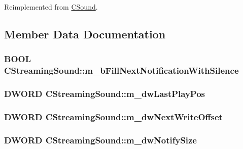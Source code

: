 Reimplemented from \hyperlink{class_c_sound_aaf2b066d599976ba180082b4fa3880e3}{CSound}.

\subsection{Member Data Documentation}
\hypertarget{class_c_streaming_sound_ab229235758b70b36c2e1aeb3d877678c}{
\subsubsection[{m\_\-bFillNextNotificationWithSilence}]{\setlength{\rightskip}{0pt plus 5cm}BOOL {\bf CStreamingSound::m\_\-bFillNextNotificationWithSilence}}}
\label{class_c_streaming_sound_ab229235758b70b36c2e1aeb3d877678c}
\hypertarget{class_c_streaming_sound_a3f94f44e925644eeb62452486cd02426}{
\subsubsection[{m\_\-dwLastPlayPos}]{\setlength{\rightskip}{0pt plus 5cm}DWORD {\bf CStreamingSound::m\_\-dwLastPlayPos}}}
\label{class_c_streaming_sound_a3f94f44e925644eeb62452486cd02426}
\hypertarget{class_c_streaming_sound_a89acb4aad3668f834de1839c3a392862}{
\subsubsection[{m\_\-dwNextWriteOffset}]{\setlength{\rightskip}{0pt plus 5cm}DWORD {\bf CStreamingSound::m\_\-dwNextWriteOffset}}}
\label{class_c_streaming_sound_a89acb4aad3668f834de1839c3a392862}
\hypertarget{class_c_streaming_sound_a073ea54d4aa5ade06dd00f75cb0e07cd}{
\subsubsection[{m\_\-dwNotifySize}]{\setlength{\rightskip}{0pt plus 5cm}DWORD {\bf CStreamingSound::m\_\-dwNotifySize}}}
